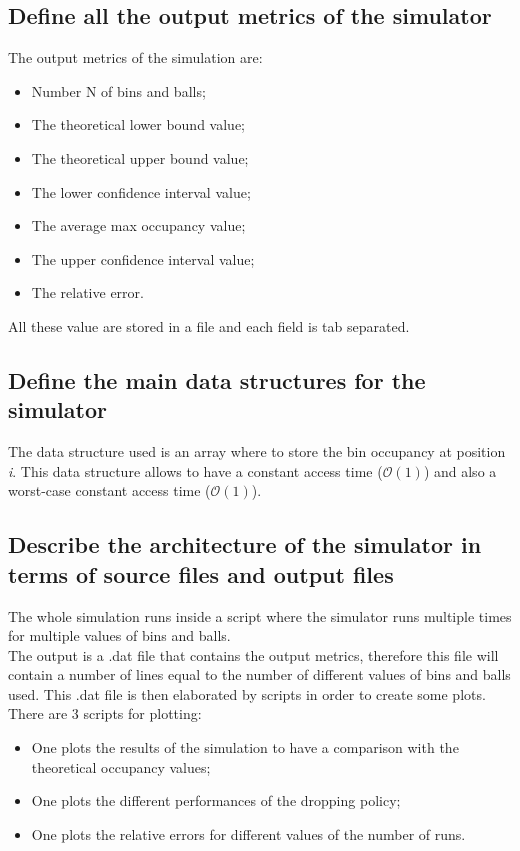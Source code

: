 \documentclass{report}
\begin{document}
{	\subsection{Define all the output metrics of the simulator}
			The output metrics of the simulation are:
			\begin{itemize}
				\item Number N of bins and balls;
				\item The theoretical lower bound value;
				\item The theoretical upper bound value;
				\item The lower confidence interval value;
				\item The average max occupancy value;
				\item The upper confidence interval value;
				\item The relative error.
			\end{itemize}
			All these value are stored in a file and each field is tab separated.
	
	\subsection{Define the main data structures for the simulator}
			The data structure used is an array where to store the bin occupancy at position \emph{i}. This data structure allows to have a constant access time ($\mathcal{O}(1)$) and also a worst-case constant access time ($\mathcal{O}(1)$).
			
	\subsection{Describe the architecture of the simulator in terms of source files and output files}
			The whole simulation runs inside a script where the simulator runs multiple times for multiple values of bins and balls. \\
			The output is a .dat file that contains the output metrics, therefore this file will contain a number of lines equal to the number of different values of bins and balls used. This .dat file is then elaborated by scripts in order to create some plots. There are 3 scripts for plotting:
			\begin{itemize}
				\item One plots the results of the simulation to have a comparison with the theoretical occupancy values;
				\item One plots the different performances of the dropping policy;
				\item One plots the relative errors for different values of the number of runs.
			\end{itemize}
			
}
\end{document}
